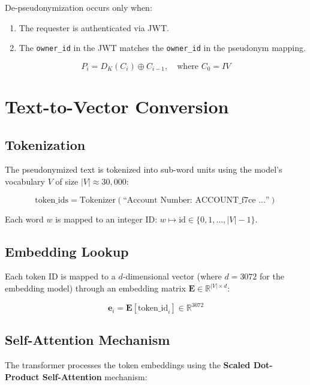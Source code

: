 De-pseudonymization occurs only when:
\begin{enumerate}
    \item The requester is authenticated via JWT.
    \item The \texttt{owner\_id} in the JWT matches the \texttt{owner\_id} in the pseudonym mapping.
\end{enumerate}

\begin{equation}
P_i = D_K(C_i) \oplus C_{i-1}, \quad \text{where } C_0 = IV
\end{equation}

\section{Text-to-Vector Conversion}

\subsection{Tokenization}

The pseudonymized text is tokenized into sub-word units using the model's vocabulary $V$ of size $|V| \approx 30,000$:

\begin{equation}
\text{token\_ids} = \text{Tokenizer}(\text{``Account Number: ACCOUNT\_f7ce ...''})
\end{equation}

Each word $w$ is mapped to an integer ID: $w \mapsto \text{id} \in \{0, 1, \ldots, |V|-1\}$.

\subsection{Embedding Lookup}

Each token ID is mapped to a $d$-dimensional vector (where $d = 3072$ for the embedding model) through an embedding matrix $\mathbf{E} \in \mathbb{R}^{|V| \times d}$:

\begin{equation}
\mathbf{e}_i = \mathbf{E}[\text{token\_id}_i] \in \mathbb{R}^{3072}
\end{equation}

\subsection{Self-Attention Mechanism}

The transformer processes the token embeddings using the \textbf{Scaled Dot-Product Self-Attention} mechanism:

